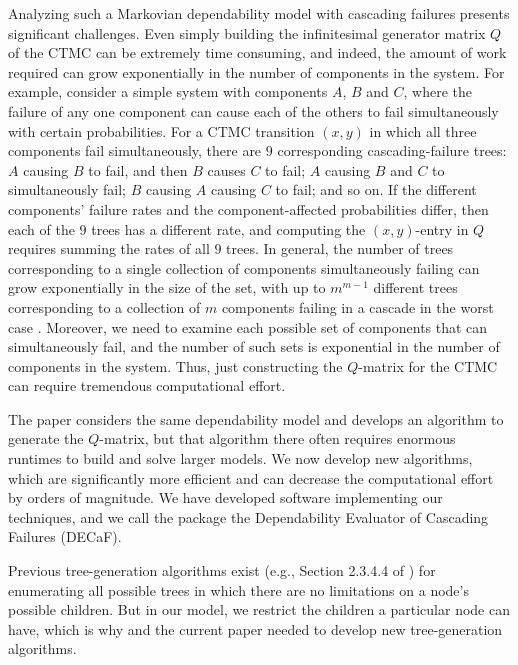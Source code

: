 \documentclass[12pt]{article}
\newcommand{\changed}[1]{#1}
\newcommand{\changed}[1]{\textcolor{red}{#1}}
\begin{document}
Analyzing such a Markovian dependability model with cascading failures
presents significant challenges. Even simply building the infinitesimal
generator matrix $Q$ of the CTMC can be extremely time consuming, and indeed,
the amount of work required can grow exponentially in the number of components
in the system. For example, consider a simple system with components $A$, $B$
and $C$, where the failure of any one component can cause each of the others
to fail simultaneously with certain probabilities. For a CTMC transition
$(x,y)$ in which all three components fail simultaneously, there are $9$
corresponding cascading-failure trees: $A$ causing $B$ to fail, and then $B$
causes $C$ to fail; $A$ causing $B$ and $C$ to simultaneously fail; $B$
causing $A$ causing $C$ to fail; and so on. If the different components'
failure rates and the component-affected probabilities differ, then each of
the $9$ trees has a different rate, and computing the $(x,y)$-entry in $Q$
requires summing the rates of all $9$ trees. In general, the number of trees
corresponding to a single collection of components simultaneously failing can
grow exponentially in the size of the set, %
\changed{with up to
$m^{m-1}$ different trees corresponding to a collection of $m$ components
failing in a cascade in the worst case}
\cite{ING:2009}.
Moreover, we need to examine each possible set of components that can
simultaneously fail, and the number of such sets is exponential in the number
of components in the system. Thus, just constructing the $Q$-matrix for the
CTMC can require tremendous computational effort.

The paper \cite{ING:2009} considers the same dependability model and develops
an algorithm to generate the $Q$-matrix, but that algorithm there often
requires enormous runtimes to build and solve larger models. We now develop
new algorithms, which are significantly more efficient and can decrease the
computational effort by orders of magnitude. We have developed software
implementing our techniques, and we call the package the Dependability
Evaluator of Cascading Failures (DECaF).

Previous tree-generation algorithms exist (e.g., Section 2.3.4.4 of
\cite{Knut:1997}) for enumerating all possible trees in which there are no
limitations on a node's possible children. But in our model, we restrict the
children a particular node can have, which is why \cite{ING:2009} and the
current paper needed to develop new tree-generation algorithms.
\end{document}
